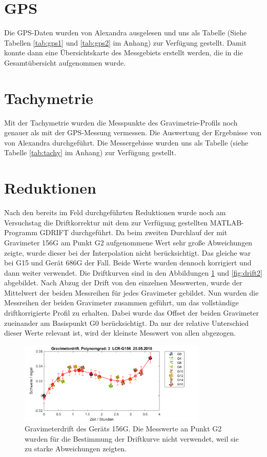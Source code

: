 \section{GPS}

Die GPS-Daten wurden von Alexandra ausgelesen und uns als Tabelle (Siehe Tabellen \ref{tab:gps1} und \ref{tab:gps2} im Anhang) zur Verfügung gestellt. Damit konnte dann eine Übersichtskarte des Messgebiets erstellt werden, die in die Gesamtübersicht aufgenommen wurde.

\section{Tachymetrie}

Mit der Tachymetrie wurden die Messpunkte des Gravimetrie-Profils noch genauer als mit der GPS-Messung vermessen. Die Auswertung der Ergebnisse von von Alexandra durchgeführt. Die Messergebisse wurden uns als Tabelle (siehe Tabelle \ref{tab:tachy} im Anhang) zur Verfügung gestellt.

\section{Reduktionen}

Nach den bereits im Feld durchgeführten Reduktionen wurde noch am Versuchstag die Driftkorrektur mit dem zur Verfügung gestellten MATLAB-Programm GDRIFT durchgeführt. Da beim zweiten Durchlauf der mit Gravimeter 156G am Punkt G2 aufgenommene Wert sehr große Abweichungen zeigte, wurde dieser bei der Interpolation nicht berücksichtigt. Das gleiche war bei G15 und Gerät 686G der Fall. Beide Werte wurden dennoch korrigiert und dann weiter verwendet. Die Driftkurven sind in den Abbildungen \ref{fig:drift1} und \ref{fig:drift2} abgebildet. Nach Abzug der Drift von den einzelnen Messwerten, wurde der Mittelwert der beiden Messreihen für jedes Gravimeter gebildet. Nun wurden die Messreihen der beiden Gravimeter zusammen geführt, um das vollständige driftkorrigierte Profil zu erhalten. Dabei wurde das Offset der beiden Gravimeter zueinander am Basispunkt G0 berücksichtigt. Da nur der relative Unterschied dieser Werte relevant ist, wird der kleinste Messwert von allen abgezogen.

\begin{figure}[!ht]
 \centering
 \includegraphics[width=0.8\textwidth]{fig/G156drift_endgultig}
 \caption[Gravimeterdrift des Geräts 156G]{Gravimeterdrift des Geräts 156G. Die Messwerte an Punkt G2 wurden für die Bestimmung der Driftkurve nicht verwendet, weil sie zu starke Abweichungen zeigten.}
 \label{fig:drift1}
\end{figure}

